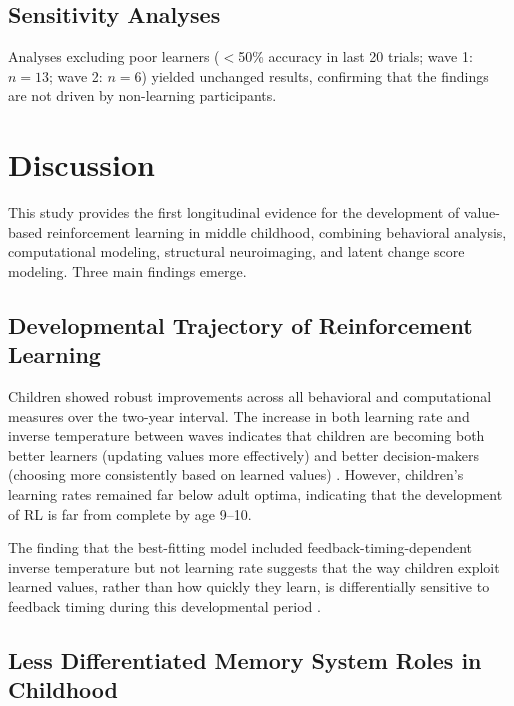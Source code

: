 \documentclass[12pt]{article}
\begin{document}
\subsection{Sensitivity Analyses}

Analyses excluding poor learners ($<$50\% accuracy in last 20 trials; wave 1: $n = 13$; wave 2: $n = 6$) yielded unchanged results, confirming that the findings are not driven by non-learning participants.

\section{Discussion}

This study provides the first longitudinal evidence for the development of value-based reinforcement learning in middle childhood, combining behavioral analysis, computational modeling, structural neuroimaging, and latent change score modeling. Three main findings emerge.

\subsection{Developmental Trajectory of Reinforcement Learning}

Children showed robust improvements across all behavioral and computational measures over the two-year interval. The increase in both learning rate and inverse temperature between waves indicates that children are becoming both better learners (updating values more effectively) and better decision-makers (choosing more consistently based on learned values) \citep{palminteri2016computational, nussenbaum2020development}. However, children's learning rates remained far below adult optima, indicating that the development of RL is far from complete by age 9--10.

The finding that the best-fitting model included feedback-timing-dependent inverse temperature but not learning rate suggests that the way children exploit learned values, rather than how quickly they learn, is differentially sensitive to feedback timing during this developmental period \citep{daw2011trial}.

\subsection{Less Differentiated Memory System Roles in Childhood}
\end{document}
